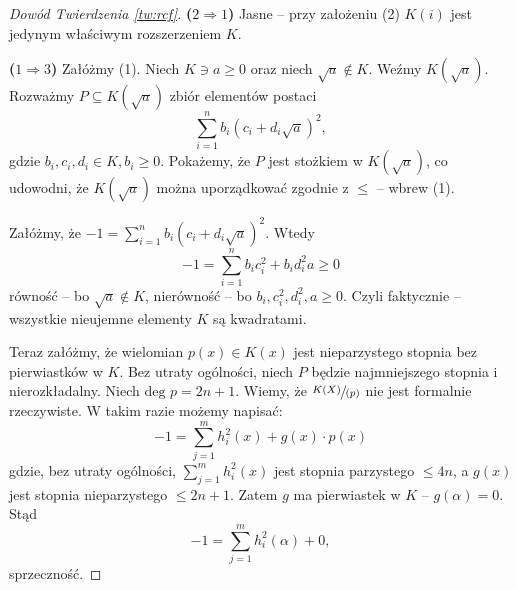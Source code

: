 \documentclass{article}
\theoremstyle{plain}
\theoremstyle{definition}
\theoremstyle{remark}
\begin{document}
\begin{proof}[Dowód Twierdzenia \ref{tw:rcf}]

	\textbf{($2 \Rightarrow 1$)}
	Jasne -- przy założeniu (2) $K(i)$ jest jedynym właściwym rozszerzeniem
	$K$.

	\textbf{($1 \Rightarrow 3$)}
	Załóżmy (1). Niech $K \ni a \geq 0$ oraz niech
	$\sqrt{a} \notin K$. Weźmy $K(\sqrt{a})$. Rozważmy $P \subseteq
	K(\sqrt{a})$ zbiór elementów postaci
	\[
		\sum_{i=1}^{n} b_i (c_i + d_i \sqrt{a})^2,
	\]
	gdzie $b_i, c_i, d_i \in K, b_i \geq 0$. Pokażemy, że $P$ jest stożkiem
	w $K(\sqrt{a})$, co udowodni, że $K(\sqrt{a})$ można uporządkować
	zgodnie z $\leq$ -- wbrew (1).

	Załóżmy, że $-1 = \sum_{i=1}^n b_i (c_i + d_i \sqrt{a})^2$.%
	Wtedy
	$$ -1 = \sum_{i=1}^n b_i c_i^2 + b_i d_i^2 a \geq 0$$
	równość -- bo $\sqrt{a} \notin K$,
	nierówność -- bo $b_i, c_i^2, d_i^2, a \geq 0$.
	Czyli faktycznie -- wszystkie nieujemne elementy $K$ są kwadratami.

	Teraz załóżmy, że wielomian $p(x) \in K(x)$ jest nieparzystego stopnia
	bez pierwiastków w $K$. Bez utraty ogólności, niech $P$ będzie
	najmniejszego stopnia i nierozkładalny. %
	Niech $\text{deg } p = 2n + 1$. Wiemy, że $\sfrac{K(X)}{(p)}$ nie jest
	formalnie rzeczywiste. W takim razie możemy napisać: %
	\[
		- 1 = \sum_{j=1}^m h_i^2(x) + g(x) \cdot p(x)
	\]
	gdzie, bez utraty ogólności, $\sum_{j=1}^m h_i^2(x)$ jest stopnia
	parzystego $\leq 4n$, a $g(x)$ jest stopnia nieparzystego $\leq 2n + 1$.
	Zatem $g$ ma pierwiastek w $K$ -- $g(\alpha) = 0$. Stąd
	\[
		- 1 = \sum_{j=1}^m h_i^2(\alpha) + 0,
	\]
	sprzeczność.


\end{proof}
\end{document}
